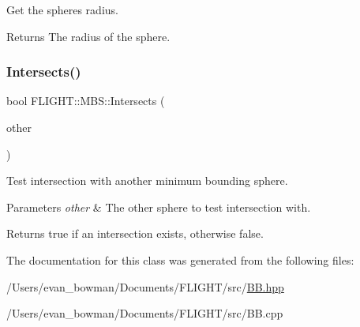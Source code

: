 Get the sphere\textquotesingle{}s radius. 

\begin{DoxyReturn}{Returns}
The radius of the sphere. 
\end{DoxyReturn}
\mbox{\label{class_f_l_i_g_h_t_1_1_m_b_s_abc1e05678a0c8e15937aeeda548ec066}} 
\subsubsection{\texorpdfstring{Intersects()}{Intersects()}}
{\footnotesize\ttfamily bool F\+L\+I\+G\+H\+T\+::\+M\+B\+S\+::\+Intersects (\begin{DoxyParamCaption}\item[{const \hyperlink{class_f_l_i_g_h_t_1_1_m_b_s}{M\+BS} \&}]{other }\end{DoxyParamCaption})}



Test intersection with another minimum bounding sphere. 


\begin{DoxyParams}{Parameters}
{\em other} & The other sphere to test intersection with. \\
\hline
\end{DoxyParams}
\begin{DoxyReturn}{Returns}
true if an intersection exists, otherwise false. 
\end{DoxyReturn}


The documentation for this class was generated from the following files\+:\begin{DoxyCompactItemize}
\item 
/\+Users/evan\+\_\+bowman/\+Documents/\+F\+L\+I\+G\+H\+T/src/\hyperlink{_b_b_8hpp}{B\+B.\+hpp}\item 
/\+Users/evan\+\_\+bowman/\+Documents/\+F\+L\+I\+G\+H\+T/src/B\+B.\+cpp\end{DoxyCompactItemize}
